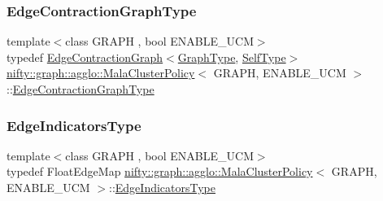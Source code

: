 \subsubsection{\texorpdfstring{Edge\+Contraction\+Graph\+Type}{EdgeContractionGraphType}}
{\footnotesize\ttfamily template$<$class G\+R\+A\+PH , bool E\+N\+A\+B\+L\+E\+\_\+\+U\+CM$>$ \\
typedef \hyperlink{classnifty_1_1graph_1_1EdgeContractionGraph}{Edge\+Contraction\+Graph}$<$\hyperlink{classnifty_1_1graph_1_1agglo_1_1MalaClusterPolicy_ae2696b85f3f04787282e003bead20a5d}{Graph\+Type}, \hyperlink{classnifty_1_1graph_1_1agglo_1_1MalaClusterPolicy}{Self\+Type}$>$ \hyperlink{classnifty_1_1graph_1_1agglo_1_1MalaClusterPolicy}{nifty\+::graph\+::agglo\+::\+Mala\+Cluster\+Policy}$<$ G\+R\+A\+PH, E\+N\+A\+B\+L\+E\+\_\+\+U\+CM $>$\+::\hyperlink{classnifty_1_1graph_1_1agglo_1_1MalaClusterPolicy_a77a5b41304b53955aafbf214e2ad356f}{Edge\+Contraction\+Graph\+Type}}

\mbox{\label{classnifty_1_1graph_1_1agglo_1_1MalaClusterPolicy_acc2c04742b370c093267afd17a14bb0c}} 
\subsubsection{\texorpdfstring{Edge\+Indicators\+Type}{EdgeIndicatorsType}}
{\footnotesize\ttfamily template$<$class G\+R\+A\+PH , bool E\+N\+A\+B\+L\+E\+\_\+\+U\+CM$>$ \\
typedef Float\+Edge\+Map \hyperlink{classnifty_1_1graph_1_1agglo_1_1MalaClusterPolicy}{nifty\+::graph\+::agglo\+::\+Mala\+Cluster\+Policy}$<$ G\+R\+A\+PH, E\+N\+A\+B\+L\+E\+\_\+\+U\+CM $>$\+::\hyperlink{classnifty_1_1graph_1_1agglo_1_1MalaClusterPolicy_acc2c04742b370c093267afd17a14bb0c}{Edge\+Indicators\+Type}}

\mbox{\label{classnifty_1_1graph_1_1agglo_1_1MalaClusterPolicy_a33924545e782bd520270341b21599e7e}} 
